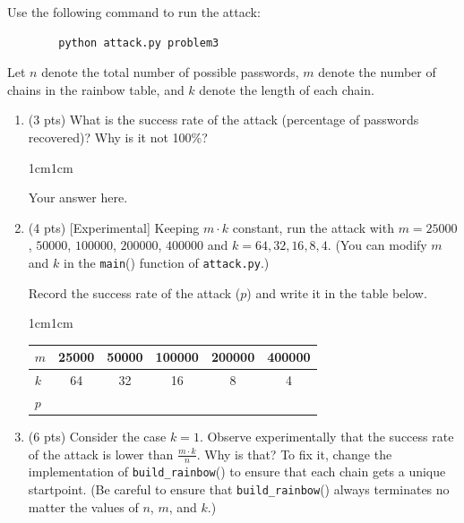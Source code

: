 \documentclass[11pt,letterpaper]{article}
\newenvironment{answer}{\em \color{blue} \begin{adjustwidth}{1cm}{1cm}}{\end{adjustwidth}}
\begin{document}
	Use the following command to run the attack:
	\begin{Verbatim}
		python attack.py problem3
	\end{Verbatim}
	
	Let $n$ denote the total number of possible passwords, $m$ denote the number of chains in the rainbow table, and $k$ denote the length of each chain.
	
	\begin{enumerate}
		\item (3 pts) What is the success rate of the attack (percentage of passwords recovered)? Why is it not 100\%?
		
		\begin{answer}
			
			Your answer here.
			
		\end{answer}
		
		\item (4 pts) [Experimental] Keeping $m \cdot k$ constant, run the attack with $m = 25000$, $50000$, $100000$, $200000$, $400000$ and $k = 64, 32, 16, 8, 4$. (You can modify $m$ and $k$ in the \texttt{main}() function of \texttt{attack.py}.) 
		
		Record the success rate of the attack ($p$) and write it in the table below.
		
		\begin{answer}
			
			\begin{center}
				\begin{tabular}{l|c|c|c|c|c|}
					\hline
					$m$ & 25000 & 50000 & 100000 & 200000 & 400000 \\ \hline
					$k$ & 64 & 32    & 16      & 8      & 4      \\ \hline \hline
					$p$ &  &   &    &   &     \\ \hline
				\end{tabular}	
			\end{center}	
			
		\end{answer}
		
		\item (6 pts) Consider the case $k=1$. Observe experimentally that the success rate of the attack is lower than $\frac{m \cdot k}{n}$. Why is that?  To fix it, change the implementation of \texttt{build\_rainbow}() to ensure that each chain gets a unique startpoint. (Be careful to ensure that \texttt{build\_rainbow}() always terminates no matter the values of $n$, $m$, and $k$.)
		

\end{enumerate}
\end{document}
